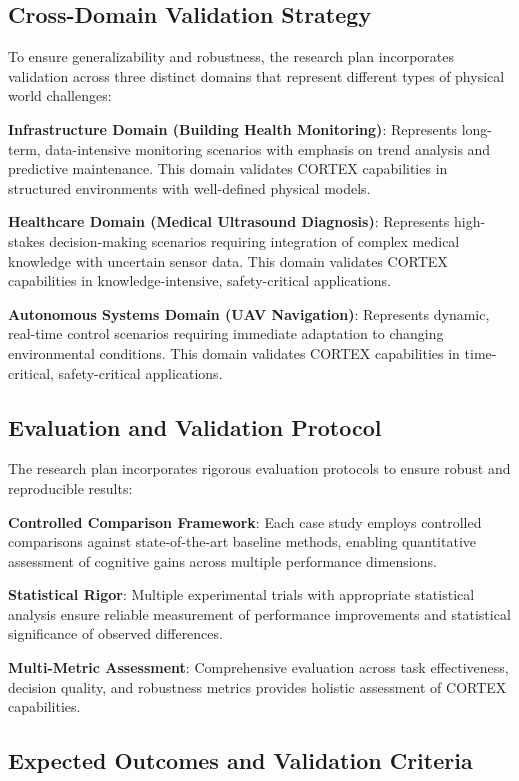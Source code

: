 \subsection{Cross-Domain Validation Strategy}

To ensure generalizability and robustness, the research plan incorporates validation across three distinct domains that represent different types of physical world challenges:

\textbf{Infrastructure Domain (Building Health Monitoring)}: Represents long-term, data-intensive monitoring scenarios with emphasis on trend analysis and predictive maintenance. This domain validates CORTEX capabilities in structured environments with well-defined physical models.

\textbf{Healthcare Domain (Medical Ultrasound Diagnosis)}: Represents high-stakes decision-making scenarios requiring integration of complex medical knowledge with uncertain sensor data. This domain validates CORTEX capabilities in knowledge-intensive, safety-critical applications.

\textbf{Autonomous Systems Domain (UAV Navigation)}: Represents dynamic, real-time control scenarios requiring immediate adaptation to changing environmental conditions. This domain validates CORTEX capabilities in time-critical, safety-critical applications.

\subsection{Evaluation and Validation Protocol}

The research plan incorporates rigorous evaluation protocols to ensure robust and reproducible results:

\textbf{Controlled Comparison Framework}: Each case study employs controlled comparisons against state-of-the-art baseline methods, enabling quantitative assessment of cognitive gains across multiple performance dimensions.

\textbf{Statistical Rigor}: Multiple experimental trials with appropriate statistical analysis ensure reliable measurement of performance improvements and statistical significance of observed differences.

\textbf{Multi-Metric Assessment}: Comprehensive evaluation across task effectiveness, decision quality, and robustness metrics provides holistic assessment of CORTEX capabilities.

\subsection{Expected Outcomes and Validation Criteria}

